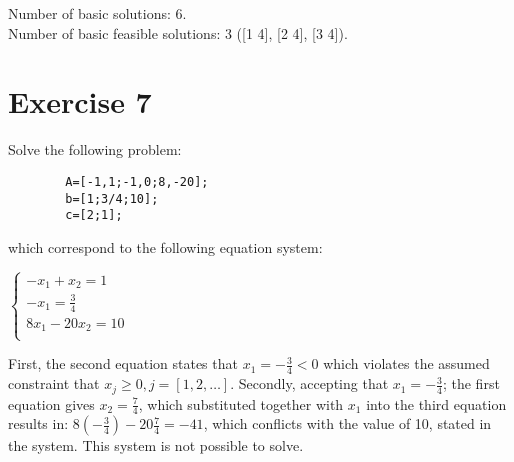 \documentclass{article}
\begin{document}
    \noindent
    Number of basic solutions: 6. \\
    Number of basic feasible solutions: 3 ([1 4], [2 4], [3 4]).

\section*{Exercise 7}

    Solve the following problem:

    \begin{lstlisting}
        A=[-1,1;-1,0;8,-20];
        b=[1;3/4;10];
        c=[2;1];
    \end{lstlisting}

    which correspond to the following equation system:

    \begin{center}
        \begin{math}
            \begin{cases}
                -x_1 + x_2 = 1 \\
                -x_1 = \frac{3}{4} \\
                8x_1 - 20x_2 = 10 \\
            \end{cases}
        \end{math}
    \end{center}

    First, the second equation states that $x_1 = -\frac{3}{4} < 0$ which violates the assumed
    constraint that $x_j \geq 0 , j=[1,2,\dots]$. Secondly, accepting that $x_1 =
    -\frac{3}{4}$; the first equation gives $x_2 = \frac{7}{4}$, which
    substituted together with $x_1$ into the third equation results in:
    $8(-\frac{3}{4}) - 20\frac{7}{4} = -41$, which conflicts with the value of
    10, stated in the system. This system is not possible to solve.
\end{document}
